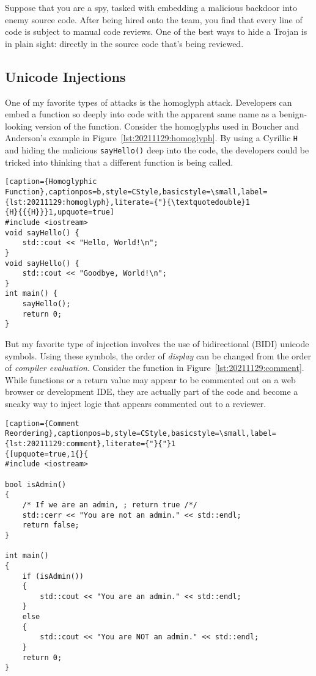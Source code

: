 Suppose that you are a spy, tasked with embedding a malicious backdoor into enemy source code. After being hired onto the team, you find that every line of code is subject to manual code reviews. One of the best ways to hide a Trojan is in plain sight: directly in the source code that's being reviewed.

\subsection{Unicode Injections}
One of my favorite types of attacks is the homoglyph attack.\autocite{20211129:hood} Developers can embed a function so deeply into code with the apparent same name as a benign-looking version of the function. Consider the homoglyphs used in Boucher and Anderson's example in Figure~\ref{lst:20211129:homoglyph}.\autocite{20211129:boucher} By using a Cyrillic \texttt{Н} and hiding the malicious \texttt{sayНello()} deep into the code, the developers could be tricked into thinking that a different function is being called.

\begin{lstlisting}[caption={Homoglyphic Function},captionpos=b,style=CStyle,basicstyle=\small,label={lst:20211129:homoglyph},literate={"}{\textquotedouble}1
{Н}{{{Н}}}1,upquote=true]
#include <iostream>
void sayHello() {
	std::cout << "Hello, World!\n";
}
void sayНello() {
	std::cout << "Goodbye, World!\n";
}
int main() {
	sayНello();
	return 0;
}
\end{lstlisting}

But my favorite type of injection involves the use of bidirectional (BIDI) unicode symbols. Using these symbols, the order of \textit{display} can be changed from the order of \textit{compiler evaluation}. Consider the function in Figure~\ref{lst:20211129:comment}. While functions or a return value may appear to be commented out on a web browser or development IDE, they are actually part of the code and become a sneaky way to inject logic that appears commented out to a reviewer.

\begin{lstlisting}[caption={Comment Reordering},captionpos=b,style=CStyle,basicstyle=\small,label={lst:20211129:comment},literate={"}{"}1
{⁧}{⁧}1,upquote=true]
#include <iostream>

bool isAdmin()
{
	/* If we are an admin, ⁧ /*/ return true ;
	std::cerr << "You are not an admin." << std::endl;
	return false;
}

int main()
{
	if (isAdmin())
	{
		std::cout << "You are an admin." << std::endl;
	}
	else
	{
		std::cout << "You are NOT an admin." << std::endl;
	}
	return 0;
}
\end{lstlisting}
